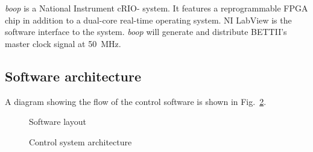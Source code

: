 \textit{boop} is a National Instrument cRIO- system. It features a reprogrammable FPGA chip in addition to a dual-core real-time operating system. NI LabView is the software interface to the system. \textit{boop} will generate and distribute BETTII's master clock signal at \SI{50}{\mega\hertz}.

\subsection{Software architecture}

A diagram showing the flow of the control software is shown in Fig.~\ref{fig:ControlSystem}. 
\begin{figure}[!ht]
	\centering
	
	\caption[Software diagram]{Software layout}
	\label{fig:SoftwareFlow}
    \end{figure}


\begin{figure}[!ht]
	\centering
	
	\caption[Control System Design]{Control system architecture}
	\label{fig:ControlSystem}
    \end{figure}

